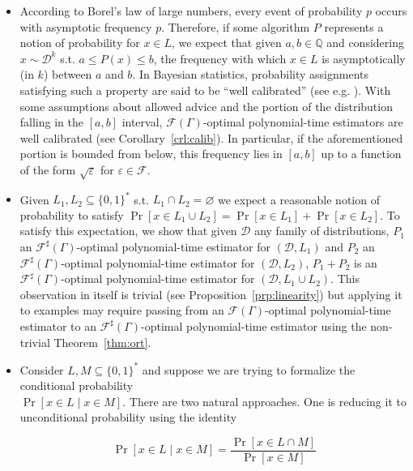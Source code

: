 \documentclass[11pt]{article}
\numberwithin{equation}{section}
\theoremstyle{definition}
\theoremstyle{plain}
\newcommand{\Bool}{\{0,1\}}
\newcommand{\Words}{{\Bool^*}}
\DeclareMathOperator{\Prb}{Pr}
\newcommand{\Rats}{\mathbb{Q}}
\newcommand{\Dist}{\mathcal{D}}
\newcommand{\Fall}{\mathcal{F}}
\newcommand{\EG}{\Fall(\Gamma)}
\newcommand{\ESG}{\Fall^\sharp(\Gamma)}
\begin{document}
\begin{itemize}
\item 
According to Borel's law of large numbers, every event of probability ${p}$ occurs with asymptotic frequency ${p}$. Therefore, if some algorithm ${P}$ represents a notion of probability for ${x \in L}$, we expect that given ${a,b \in \Rats}$ and considering ${x \sim \Dist^k}$ s.t. ${a \leq P(x) \leq b}$, the frequency with which ${x \in L}$ is asymptotically (in ${k}$) between ${a}$ and ${b}$. In Bayesian statistics, probability assignments satisfying such a property are said to be \enquote{well calibrated} (see e.g. \cite{Dawid_1982}). With some assumptions about allowed advice and the portion of the distribution falling in the ${[a,b]}$ interval, ${\EG}$-optimal polynomial-time estimators are well calibrated (see Corollary~\ref{crl:calib}). In particular, if the aforementioned portion is bounded from below, this frequency lies in ${[a,b]}$ up to a function of the form ${\sqrt{\varepsilon}}$ for ${\varepsilon \in \Fall}$.
\item
Given ${L_1, L_2 \subseteq \Words}$ s.t. ${L_1 \cap L_2 = \varnothing}$ we expect a reasonable notion of probability to satisfy ${\Prb[x \in L_1 \cup L_2] = \Prb[x \in L_1] + \Prb[x \in L_2]}$. To satisfy this expectation, we show that given ${\Dist}$ any family of distributions, ${P_1}$ an ${\ESG}$-optimal polynomial-time estimator for ${(\Dist,L_1)}$ and ${P_2}$ an ${\ESG}$-optimal polynomial-time estimator for ${(\Dist,L_2)}$, ${P_1 + P_2}$ is an ${\ESG}$-optimal polynomial-time estimator for ${(\Dist, L_1 \cup L_2)}$. This observation in itself is trivial (see Proposition~\ref{prp:linearity}) but applying it to examples may require passing from an ${\EG}$-optimal polynomial-time estimator to an ${\ESG}$-optimal polynomial-time estimator using the non-trivial Theorem~\ref{thm:ort}.
\item
Consider ${L,M \subseteq \Words}$ and suppose we are trying to formalize the conditional probability\\ ${\Prb[x \in L \mid x \in M]}$. There are two natural approaches. One is reducing it to unconditional probability using the identity 

\[\Prb[x \in L \mid x \in M]=\frac{\Prb[x \in L \cap M]}{\Prb[x \in M]}\]


\end{itemize}
\end{document}

